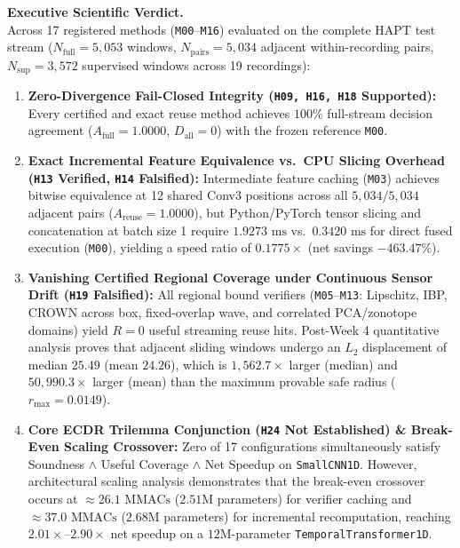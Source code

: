 \documentclass[11pt,a4paper]{article}
\newcommand{\code}[1]{{\small\ttfamily\nolinkurl{#1}}}
\theoremstyle{remark}
\begin{document}
\begin{titlepage}
\vspace{0.6cm}
\noindent\colorbox{pale}{%
\parbox{\dimexpr\linewidth-2\fboxsep}{%
\textbf{\color{ink}Executive Scientific Verdict.}\\[3pt]
Across 17 registered methods (\code{M00}--\code{M16}) evaluated on the complete HAPT test stream ($N_{\text{full}} = 5,053$ windows, $N_{\text{pairs}} = 5,034$ adjacent within-recording pairs, $N_{\text{sup}} = 3,572$ supervised windows across 19 recordings):
\begin{enumerate}[leftmargin=1.4em]
  \item \textbf{Zero-Divergence Fail-Closed Integrity (\code{H09, H16, H18} Supported):} Every certified and exact reuse method achieves $100\%$ full-stream decision agreement ($A_{\text{full}} = 1.0000$, $D_{\text{all}} = 0$) with the frozen reference \code{M00}.
  \item \textbf{Exact Incremental Feature Equivalence vs.\ CPU Slicing Overhead (\code{H13} Verified, \code{H14} Falsified):} Intermediate feature caching (\code{M03}) achieves bitwise equivalence at 12 shared Conv3 positions across all $5,034/5,034$ adjacent pairs ($A_{\text{reuse}} = 1.0000$), but Python/PyTorch tensor slicing and concatenation at batch size 1 require $1.9273\text{ ms}$ vs.\ $0.3420\text{ ms}$ for direct fused execution (\code{M00}), yielding a speed ratio of $0.1775\times$ (net savings $-463.47\%$).
  \item \textbf{Vanishing Certified Regional Coverage under Continuous Sensor Drift (\code{H19} Falsified):} All regional bound verifiers (\code{M05}--\code{M13}: Lipschitz, IBP, CROWN across box, fixed-overlap wave, and correlated PCA/zonotope domains) yield $R = 0$ useful streaming reuse hits. Post-Week 4 quantitative analysis proves that adjacent sliding windows undergo an $L_2$ displacement of median $25.49$ (mean $24.26$), which is $1,562.7\times$ larger (median) and $50,990.3\times$ larger (mean) than the maximum provable safe radius ($r_{\max} = 0.0149$).
  \item \textbf{Core ECDR Trilemma Conjunction (\code{H24} Not Established) \& Break-Even Scaling Crossover:} Zero of 17 configurations simultaneously satisfy Soundness $\land$ Useful Coverage $\land$ Net Speedup on \code{SmallCNN1D}. However, architectural scaling analysis demonstrates that the break-even crossover occurs at $\approx 26.1\text{ MMACs}$ ($2.51\text{M}$ parameters) for verifier caching and $\approx 37.0\text{ MMACs}$ ($2.68\text{M}$ parameters) for incremental recomputation, reaching $2.01\times$--$2.90\times$ net speedup on a $12\text{M}$-parameter \code{TemporalTransformer1D}.
\end{enumerate}
}}
\vfill
\end{titlepage}
\hypersetup{pageanchor=true}
\end{document}
